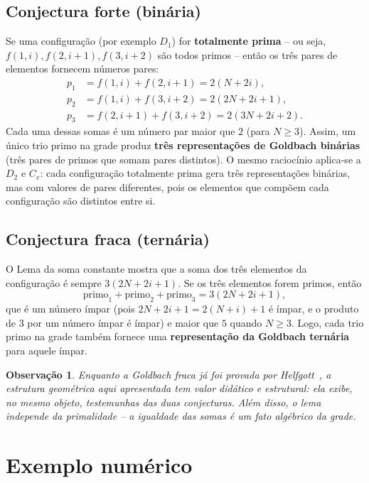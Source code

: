 \documentclass[12pt, a4paper]{article}
\newtheorem{observacao}{Observação}
\begin{document}
	\subsection{Conjectura forte (binária)}
	Se uma configuração (por exemplo $D_1$) for \textbf{totalmente prima} – ou seja, $f(1,i), f(2,i+1), f(3,i+2)$ são todos primos – então os três pares de elementos fornecem números pares:
	\begin{align*}
		p_1 &= f(1,i)+f(2,i+1) = 2(N+2i),\\
		p_2 &= f(1,i)+f(3,i+2) = 2(2N+2i+1),\\
		p_3 &= f(2,i+1)+f(3,i+2) = 2(3N+2i+2).
	\end{align*}
	Cada uma dessas somas é um número par maior que $2$ (para $N\ge 3$). Assim, um único trio primo na grade produz \textbf{três representações de Goldbach binárias} (três pares de primos que somam pares distintos). O mesmo raciocínio aplica-se a $D_2$ e $C_v$: cada configuração totalmente prima gera três representações binárias, mas com valores de pares diferentes, pois os elementos que compõem cada configuração são distintos entre si.
	
	\subsection{Conjectura fraca (ternária)}
	O Lema da soma constante mostra que a soma dos três elementos da configuração é sempre $3(2N+2i+1)$. Se os três elementos forem primos, então
	\[
	\text{primo}_1 + \text{primo}_2 + \text{primo}_3 = 3(2N+2i+1),
	\]
	que é um número ímpar (pois $2N+2i+1 = 2(N+i)+1$ é ímpar, e o produto de $3$ por um número ímpar é ímpar) e maior que $5$ quando $N\ge 3$. Logo, cada trio primo na grade também fornece uma \textbf{representação da Goldbach ternária} para aquele ímpar.
	
	\begin{observacao}
		Enquanto a Goldbach fraca já foi provada por Helfgott~\cite{helfgott2013}, a estrutura geométrica aqui apresentada tem valor didático e estrutural: ela exibe, no mesmo objeto, testemunhas das duas conjecturas. Além disso, o lema independe da primalidade – a igualdade das somas é um fato algébrico da grade.
	\end{observacao}
	
	\section{Exemplo numérico}
	
\end{document}
